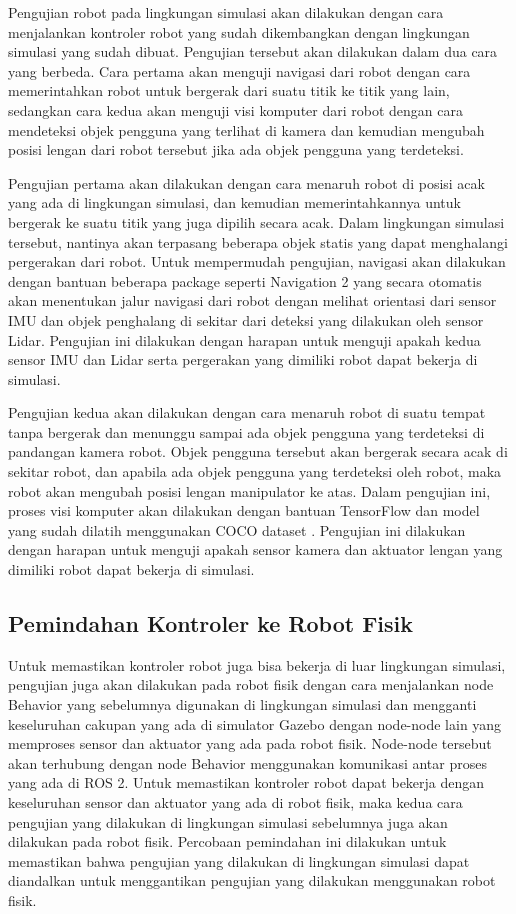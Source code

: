Pengujian robot pada lingkungan simulasi akan dilakukan dengan cara menjalankan kontroler robot yang sudah dikembangkan dengan lingkungan simulasi yang sudah dibuat.
Pengujian tersebut akan dilakukan dalam dua cara yang berbeda.
Cara pertama akan menguji navigasi dari robot dengan cara memerintahkan robot untuk bergerak dari suatu titik ke titik yang lain, sedangkan cara kedua akan menguji visi komputer dari robot dengan cara mendeteksi objek pengguna yang terlihat di kamera dan kemudian mengubah posisi lengan dari robot tersebut jika ada objek pengguna yang terdeteksi.

Pengujian pertama akan dilakukan dengan cara menaruh robot di posisi acak yang ada di lingkungan simulasi, dan kemudian memerintahkannya untuk bergerak ke suatu titik yang juga dipilih secara acak.
Dalam lingkungan simulasi tersebut, nantinya akan terpasang beberapa objek statis yang dapat menghalangi pergerakan dari robot.
Untuk mempermudah pengujian, navigasi akan dilakukan dengan bantuan beberapa package seperti Navigation 2 \citep{Navigation2} yang secara otomatis akan menentukan jalur navigasi dari robot dengan melihat orientasi dari sensor IMU dan objek penghalang di sekitar dari deteksi yang dilakukan oleh sensor Lidar.
Pengujian ini dilakukan dengan harapan untuk menguji apakah kedua sensor IMU dan Lidar serta pergerakan yang dimiliki robot dapat bekerja di simulasi.

Pengujian kedua akan dilakukan dengan cara menaruh robot di suatu tempat tanpa bergerak dan menunggu sampai ada objek pengguna yang terdeteksi di pandangan kamera robot.
Objek pengguna tersebut akan bergerak secara acak di sekitar robot, dan apabila ada objek pengguna yang terdeteksi oleh robot, maka robot akan mengubah posisi lengan manipulator ke atas.
Dalam pengujian ini, proses visi komputer akan dilakukan dengan bantuan TensorFlow \citep{TensorFlow} dan model yang sudah dilatih menggunakan COCO dataset \citep{CocoDataset}.
Pengujian ini dilakukan dengan harapan untuk menguji apakah sensor kamera dan aktuator lengan yang dimiliki robot dapat bekerja di simulasi.

\subsection{Pemindahan Kontroler ke Robot Fisik}

Untuk memastikan kontroler robot juga bisa bekerja di luar lingkungan simulasi, pengujian juga akan dilakukan pada robot fisik dengan cara menjalankan node Behavior yang sebelumnya digunakan di lingkungan simulasi dan mengganti keseluruhan cakupan yang ada di simulator Gazebo dengan node-node lain yang memproses sensor dan aktuator yang ada pada robot fisik.
Node-node tersebut akan terhubung dengan node Behavior menggunakan komunikasi antar proses yang ada di ROS 2.
Untuk memastikan kontroler robot dapat bekerja dengan keseluruhan sensor dan aktuator yang ada di robot fisik, maka kedua cara pengujian yang dilakukan di lingkungan simulasi sebelumnya juga akan dilakukan pada robot fisik.
Percobaan pemindahan ini dilakukan untuk memastikan bahwa pengujian yang dilakukan di lingkungan simulasi dapat diandalkan untuk menggantikan pengujian yang dilakukan menggunakan robot fisik.
